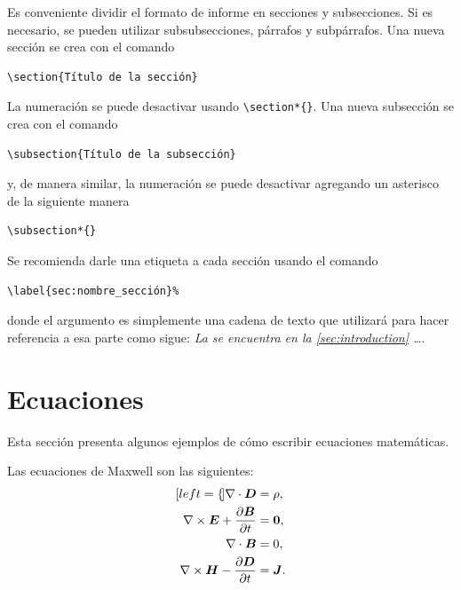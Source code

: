 \documentclass[11pt,a4paper]{article}
\begin{document}
Es conveniente dividir el formato de informe en secciones y subsecciones. Si es necesario, se pueden utilizar subsubsecciones, párrafos y subpárrafos. Una nueva sección se crea con el comando
\begin{verbatim}
\section{Título de la sección}
\end{verbatim}
La numeración se puede desactivar usando \verb|\section*{}|. Una nueva subsección se crea con el comando
\begin{verbatim}
\subsection{Título de la subsección}
\end{verbatim}
y, de manera similar, la numeración se puede desactivar agregando un asterisco de la siguiente manera 
\begin{verbatim}
\subsection*{}
\end{verbatim}
Se recomienda darle una etiqueta a cada sección usando el comando
\begin{verbatim}
\label{sec:nombre_sección}%
\end{verbatim}
donde el argumento es simplemente una cadena de texto que utilizará para hacer referencia a esa parte como sigue: \textit{La  se encuentra en la \ref{sec:introduction} \dots}.


\section{Ecuaciones}
\label{sec:eqs}
Esta sección presenta algunos ejemplos de cómo escribir ecuaciones matemáticas.

Las ecuaciones de Maxwell son las siguientes:
\begin{subequations}
    \label{eq:maxwell}
    \begin{align}[left=\empheqlbrace]
    \nabla\cdot \bm{D} & = \rho, \label{eq:maxwell1} \\
    \nabla \times \bm{E} +  \frac{\partial \bm{B}}{\partial t} & = \bm{0}, \label{eq:maxwell2} \\
    \nabla\cdot \bm{B} & = 0, \label{eq:maxwell3} \\
    \nabla \times \bm{H} - \frac{\partial \bm{D}}{\partial t} &= \bm{J}. \label{eq:maxwell4}
    \end{align}
\end{subequations}
\end{document}
